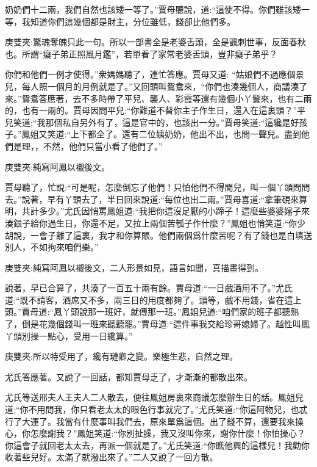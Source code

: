 \begin{parag}
奶奶們十二兩，我們自然也該矮一等了。”賈母聽說，道:“這使不得。你們雖該矮一等，我知道你們這幾個都是財主，分位雖低，錢卻比他們多。\begin{note}庚雙夾:驚魂奪魄只此一句。所以一部書全是老婆舌頭，全是諷刺世事，反面春秋也。所謂“癡子弟正照風月鑑”，若單看了家常老婆舌頭，豈非癡子弟乎？\end{note}你們和他們一例才使得。”衆媽媽聽了，連忙答應。賈母又道: “姑娘們不過應個景兒，每人照一個月的月例就是了。”又回頭叫鴛鴦來，“你們也湊幾個人，商議湊了來。”鴛鴦答應著，去不多時帶了平兒、襲人、彩霞等還有幾個小丫鬟來，也有二兩的，也有一兩的。賈母因問平兒:“你難道不替你主子作生日，還入在這裏頭？”平兒笑道:“我那個私自另外有了，這是官中的，也該出一分。”賈母笑道:“這纔是好孩子。”鳳姐又笑道:“上下都全了。還有二位姨奶奶，他出不出，也問一聲兒。盡到他們是理，，不然，他們只當小看了他們了。”\begin{note}庚雙夾:純寫阿鳳以襯後文。\end{note}賈母聽了，忙說:“可是呢，怎麼倒忘了他們！只怕他們不得閒兒，叫一個丫頭問問去。”說著，早有丫頭去了，半日回來說道:“每位也出二兩。”賈母喜道:“拿筆硯來算明，共計多少。”尤氏因悄罵鳳姐道:“我把你這沒足厭的小蹄子！這麼些婆婆嬸子來湊銀子給你過生日，你還不足，又拉上兩個苦瓠子作什麼？”鳳姐也悄笑道:“你少胡說，一會子離了這裏，我才和你算賬。他們兩個爲什麼苦呢？有了錢也是白填送別人，不如拘來咱們樂。”\begin{note}庚雙夾:純寫阿鳳以襯後文，二人形景如見，語言如聞，真描畫得到。\end{note}
\end{parag}


\begin{parag}
    說著，早已合算了，共湊了一百五十兩有餘。賈母道:“一日戲酒用不了。”尤氏道:“既不請客，酒席又不多，兩三日的用度都夠了。頭等，戲不用錢，省在這上頭。”賈母道:“鳳丫頭說那一班好，就傳那一班。”鳳姐兒道:“咱們家的班子都聽熟了，倒是花幾個錢叫一班來聽聽罷。”賈母道:“這件事我交給珍哥媳婦了。越性叫鳳丫頭別操一點心，受用一日纔算。”\begin{note}庚雙夾:所以特受用了，纔有璉卿之變。樂極生悲，自然之理。\end{note}尤氏答應著。又說了一回話，都知賈母乏了，才漸漸的都散出來。
\end{parag}


\begin{parag}
    尤氏等送邢夫人王夫人二人散去，便往鳳姐房裏來商議怎麼辦生日的話。鳳姐兒道:“你不用問我，你只看老太太的眼色行事就完了。”尤氏笑道:“你這阿物兒，也忒行了大運了。我當有什麼事叫我們去，原來單爲這個。出了錢不算，還要我來操心，你怎麼謝我？”鳳姐笑道:“你別扯臊，我又沒叫你來，謝你什麼！你怕操心？你這會子就回老太太去，再派一個就是了。”尤氏笑道:“你瞧他興的這樣兒！我勸你收著些兒好。太滿了就潑出來了。”二人又說了一回方散。
\end{parag}


